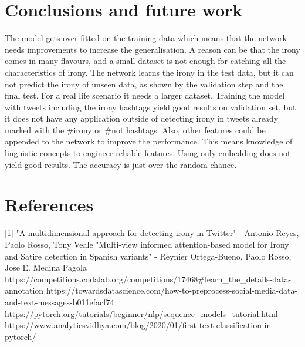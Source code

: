 \documentclass[11pt]{article}
\begin{document}
    \section{Conclusions and future work}\label{sec:conclusions-and-future-work}
The model gets over-fitted on the training data which means that the network needs improvements to increase the generalisation.
A reason can be that the irony comes in many flavours, and a small dataset is not enough for catching all the characteristics of irony.
The network learns the irony in the test data, but it can not predict the irony of unseen data, as shown by the validation step and the final test.
For a real life scenario it needs a larger dataset.
Training the model with tweets including the irony hashtags yield good results on validation set, but it does not have any application outside of detecting irony in tweets already marked with the \#irony or \#not hashtags.
    Also, other features could be appended to the network to improve the performance.
    This means knowledge of linguistic concepts to engineer reliable features.
Using only embedding does not yield good results.
The accuracy is just over the random chance.

    \section{References}\label{sec:references}
    [1] "A multidimensional approach for detecting irony in Twitter" - Antonio Reyes, Paolo Rosso, Tony Veale
\newline
    [2] "Multi-view informed attention-based model for Irony and Satire detection in Spanish variants" - Reynier Ortega-Bueno, Paolo Rosso,  Jose E. Medina Pagola
\newline
    [3] https://competitions.codalab.org/competitions/17468\#learn\_the\_details-data-annotation
    \newline
    [4] https://towardsdatascience.com/how-to-preprocess-social-media-data-and-text-messages-b011efacf74
    \newline
    [5] https://pytorch.org/tutorials/beginner/nlp/sequence\_models\_tutorial.html
    \newline
    [6] https://www.analyticsvidhya.com/blog/2020/01/first-text-classification-in-pytorch/
\end{document}
